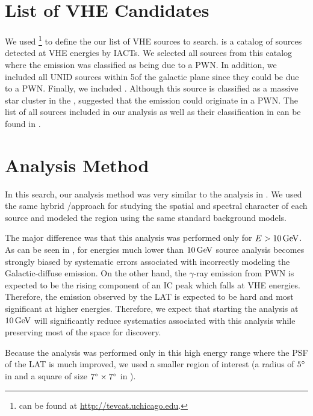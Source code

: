 \section{List of \ac{VHE}  Candidates}

We used \tevcat\footnote{\tevcat can be found at
\url{http://tevcat.uchicago.edu}.} to define the our list of \ac{VHE}
sources to search.  \tevcat is a catalog of sources detected at \ac{VHE}
energies by \acp{IACT}. We selected all sources from this catalog where
the emission was classified as being due to a \ac{PWN}. In addition,
we included all \ac{UNID} sources within 5\degree of the galactic
plane since they could be due to a \ac{PWN}.  Finally, we included
. Although this source is classified as a massive star cluster
in the \tevcat, \cite{de-naurois_2013a_galactic-h.e.s.s.} suggested that
the emission could originate in a \ac{PWN}. The list of all sources included
in our analysis as well as their classification in \tevcat can be found
in .



\section{Analysis Method} 

In this search, our analysis method was very similar to the analysis in
. We used the same hybrid \pointlike/\gtlike approach
for studying the spatial and spectral character of each source and
modeled the region using the same standard background models.

The major difference was that this analysis was performed only for
$E>10\,\text{GeV}$.  As can be seen in ,
for energies much lower than $10\,\text{GeV}$ source analysis becomes
strongly biased by systematic errors associated with incorrectly modeling
the Galactic-diffuse emission.  On the other hand, the $\gamma$-ray
emission from \ac{PWN} is expected to be the rising component of an
\ac{IC} peak which falls at \ac{VHE} energies. Therefore, the emission
observed by the \ac{LAT} is expected to be hard and most significant
at higher energies. Therefore, we expect that starting the analysis  at
$10\,\text{GeV}$ will significantly reduce systematics associated with
this analysis while preserving most of the space for discovery.

Because the analysis was performed only in this high energy range where
the \ac{PSF} of the \ac{LAT} is much improved, we used a
smaller region of interest (a radius of $5^\circ$ in \pointlike and a
square of size $7^\circ\times7^\circ$ in \gtlike).

